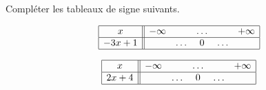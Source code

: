 
\begin{exercice}\label{exosmath-0321}

    Compléter les tableaux de signe suivants.
    \begin{multicols}{2}
    \begin{equation*}
        \begin{array}[]{|c||ccccc|}
            \hline
             x&-\infty&&\ldots&&+\infty\\
              \hline
              -3x+1&&\ldots&0&\ldots&\\ 
              \hline 
               \end{array}
           \end{equation*}


    \begin{equation*}
        \begin{array}[]{|c||ccccc|}
            \hline
             x&-\infty&&\ldots&&+\infty\\
              \hline
              2x+4&&\ldots&0&\ldots&\\ 
              \hline 
               \end{array}
           \end{equation*}

    \end{multicols}

\end{exercice}

